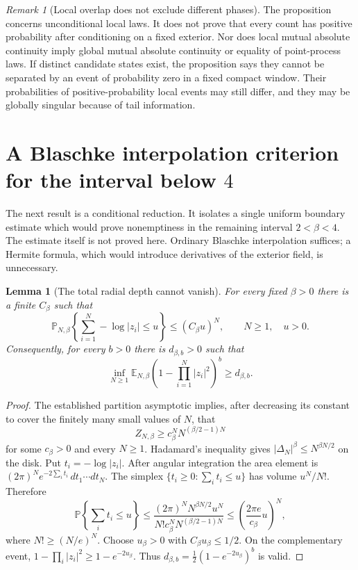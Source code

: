 \documentclass[11pt,a4paper]{article}
\numberwithin{equation}{section}
\newtheorem{lemma}[theorem]{Lemma}
\theoremstyle{definition}
\theoremstyle{remark}
\newtheorem{remark}[theorem]{Remark}
\begin{document}
\begin{remark}[Local overlap does not exclude different phases]
The proposition concerns unconditional local laws. It does not prove
that every count has positive probability after conditioning on a
fixed exterior. Nor does local mutual absolute continuity imply
global mutual absolute continuity or equality of point-process laws.
If distinct candidate states exist, the proposition says they cannot
be separated by an event of probability zero in a fixed compact
window. Their probabilities of positive-probability local events
may still differ, and they may be globally singular because of
tail information.
\end{remark}

\section{A Blaschke interpolation criterion for the interval below \texorpdfstring{$4$}{4}}
\label{sec:blaschke-boundary-moment-criterion}

The next result is a conditional reduction. It isolates a single
uniform boundary estimate which would prove nonemptiness in the
remaining interval $2<\beta<4$. The estimate itself is not proved
here. Ordinary Blaschke interpolation suffices; a Hermite formula,
which would introduce derivatives of the exterior field, is unnecessary.

\begin{lemma}[The total radial depth cannot vanish]
\label{lem:radial-depth-not-vanishing}
For every fixed $\beta>0$ there is a finite $C_\beta$ such that
\begin{equation}
 \mathbb P_{N,\beta}\left\{\sum_{i=1}^N-\log|z_i|\le u\right\}
 \le (C_\beta u)^N,\qquad N\ge1,\quad u>0.
 \label{eq:radial-depth-small-simplex}
\end{equation}
Consequently, for every $b>0$ there is $d_{\beta,b}>0$ such that
\begin{equation}
 \inf_{N\ge1}\mathbb E_{N,\beta}
 \left(1-\prod_{i=1}^N|z_i|^2\right)^b
 \ge d_{\beta,b}.
 \label{eq:blaschke-numerator-lower}
\end{equation}
\end{lemma}

\begin{proof}
The established partition asymptotic implies, after decreasing its
constant to cover the finitely many small values of $N$, that
\[
 Z_{N,\beta}\ge c_\beta^N N^{(\beta/2-1)N}
\]
for some $c_\beta>0$ and every $N\ge1$. Hadamard's inequality gives
$|\Delta_N|^\beta\le N^{\beta N/2}$ on the disk. Put
$t_i=-\log|z_i|$. After angular integration the area element is
$(2\pi)^N e^{-2\sum_i t_i}\,dt_1\cdots dt_N$. The simplex
$\{t_i\ge0:\sum_i t_i\le u\}$ has volume $u^N/N!$. Therefore
\[
 \mathbb P\left\{\sum_i t_i\le u\right\}
 \le \frac{(2\pi)^N N^{\beta N/2}u^N}
 {N!c_\beta^N N^{(\beta/2-1)N}}
 \le \left(\frac{2\pi e}{c_\beta}u\right)^N,
\]
where $N!\ge(N/e)^N$. Choose $u_\beta>0$ with
$C_\beta u_\beta\le1/2$. On the complementary event,
$1-\prod_i|z_i|^2\ge1-e^{-2u_\beta}$. Thus
$d_{\beta,b}=\tfrac12(1-e^{-2u_\beta})^b$ is valid.
\end{proof}
\end{document}
